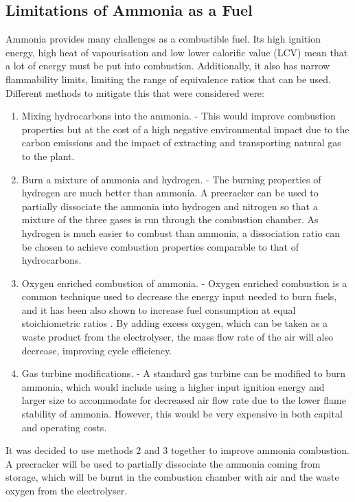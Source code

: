 \documentclass[11pt, oneside]{article}
\begin{document}
\subsection{Limitations of Ammonia as a Fuel \cite{verkamp}}
Ammonia provides many challenges as a combustible fuel. Its high ignition energy, high heat of vapourisation and low lower calorific value (LCV) mean that a lot of energy must be put into combustion. Additionally, it also has narrow flammability limits, limiting the range of equivalence ratios that can be used.  Different methods to mitigate this that were considered were:
\begin {enumerate}
\item Mixing hydrocarbons into the ammonia. - This would improve combustion properties but at the cost of a high negative environmental impact due to the carbon emissions and the impact of extracting and transporting natural gas to the plant. 
\item Burn a mixture of ammonia and hydrogen. - The burning properties of hydrogen are much better than ammonia. A precracker can be used to partially dissociate the ammonia into hydrogen and nitrogen so that a mixture of the three gases is run through the combustion chamber. As hydrogen is much easier to combust than ammonia, a dissociation ratio can be chosen to achieve combustion properties comparable to that of hydrocarbons. \cite{verkamp}
\item Oxygen enriched combustion of ammonia. - Oxygen enriched combustion is a common technique used to decrease the energy input needed to burn fuels, and it has been also shown to increase fuel consumption at equal stoichiometric ratios \cite{baskar}. By adding excess oxygen, which can be taken as a waste product from the electrolyser, the mass flow rate of the air will also decrease, improving cycle efficiency. 
\item Gas turbine modifications. - A standard gas turbine can be modified to burn ammonia, which would include using a higher input ignition energy and larger size to accommodate for decreased air flow rate due to the lower flame stability of ammonia. However, this would be very expensive in both capital and operating costs. \cite{verkamp} 
\end {enumerate}

It was decided to use methods 2 and 3 together to improve ammonia combustion. A precracker will be used to partially dissociate the ammonia coming from storage, which will be burnt in the combustion chamber with air and the waste oxygen from the electrolyser.
\end{document}
